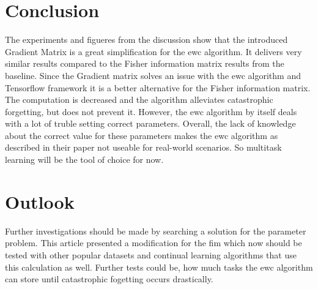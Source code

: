 \section{Conclusion}

The experiments and figueres from the discussion show that the introduced Gradient Matrix is a great simplification for the \acrshort{ewc} algorithm.
It delivers very similar results compared to the Fisher information matrix results from the baseline.
Since the Gradient matrix solves an issue with the \acrshort{ewc} algorithm and Tensorflow framework it is a better alternative for the Fisher information matrix.
The computation is decreased and the algorithm alleviates catastrophic forgetting, but does not prevent it.
However, the \acrshort{ewc} algorithm by itself deals with a lot of truble setting correct parameters.
Overall, the lack of knowledge about the correct value for these parameters makes the \acrshort{ewc} algorithm as described in their paper not useable for real-world scenarios.
So multitask learning will be the tool of choice for now.

\section{Outlook}

Further investigations should be made by searching a solution for the parameter problem.
This article presented a modification for the \acrshort{fim} which now should be tested with other popular datasets and continual learning algorithms that use this calculation as well.
Further tests could be, how much tasks the \acrshort{ewc} algorithm can store until catastrophic fogetting occurs drastically.

